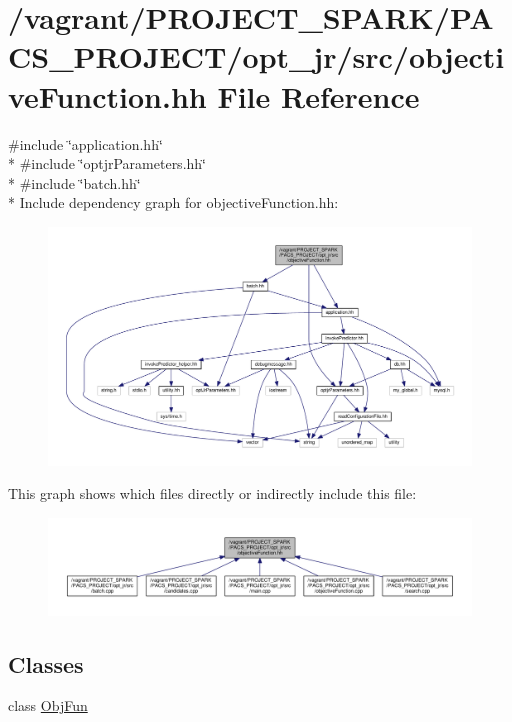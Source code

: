 \hypertarget{objectiveFunction_8hh}{\section{/vagrant/\-P\-R\-O\-J\-E\-C\-T\-\_\-\-S\-P\-A\-R\-K/\-P\-A\-C\-S\-\_\-\-P\-R\-O\-J\-E\-C\-T/opt\-\_\-jr/src/objective\-Function.hh File Reference}
\label{objectiveFunction_8hh}
}
{\ttfamily \#include \char`\"{}application.\-hh\char`\"{}}\\*
{\ttfamily \#include \char`\"{}optjr\-Parameters.\-hh\char`\"{}}\\*
{\ttfamily \#include \char`\"{}batch.\-hh\char`\"{}}\\*
Include dependency graph for objective\-Function.\-hh\-:
\nopagebreak
\begin{figure}[H]
\begin{center}
\leavevmode
\includegraphics[width=350pt]{objectiveFunction_8hh__incl}
\end{center}
\end{figure}
This graph shows which files directly or indirectly include this file\-:\nopagebreak
\begin{figure}[H]
\begin{center}
\leavevmode
\includegraphics[width=350pt]{objectiveFunction_8hh__dep__incl}
\end{center}
\end{figure}
\subsection*{Classes}
\begin{DoxyCompactItemize}
\item 
class \hyperlink{classObjFun}{Obj\-Fun}
\end{DoxyCompactItemize}
